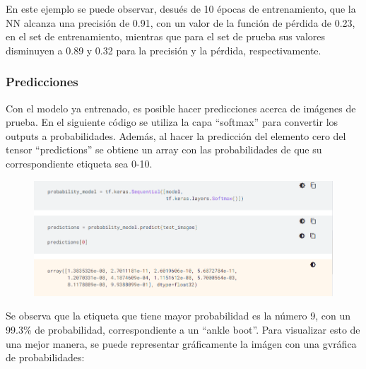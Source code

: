 \documentclass{article}
\begin{document}
En este ejemplo se puede observar, desués de 10 épocas de entrenamiento, que la NN alcanza una precisión de 0.91, con un valor de la función de pérdida de 0.23, en el set de entrenamiento, mientras que para el set de prueba sus valores disminuyen a 0.89 y 0.32 para la precisión y la pérdida, respectivamente.

\subsubsection{Predicciones}
Con el modelo ya entrenado, es posible hacer predicciones acerca de imágenes de prueba. En el siguiente código se utiliza la capa ``softmax'' para convertir los outputs a probabilidades. Además, al hacer la predicción del elemento cero del tensor ``predictions'' se obtiene un array con las probabilidades de que su correspondiente etiqueta sea 0-10.

\begin{figure}[th!]
   \includegraphics[width=\textwidth]{pred.png}
\end{figure}

Se observa que la etiqueta que tiene mayor probabilidad es la número 9, con un 99.3\% de probabilidad, correspondiente a un ``ankle boot''. Para visualizar esto de una mejor manera, se puede representar gráficamente la imágen con una gvráfica de probabilidades:
\end{document}

